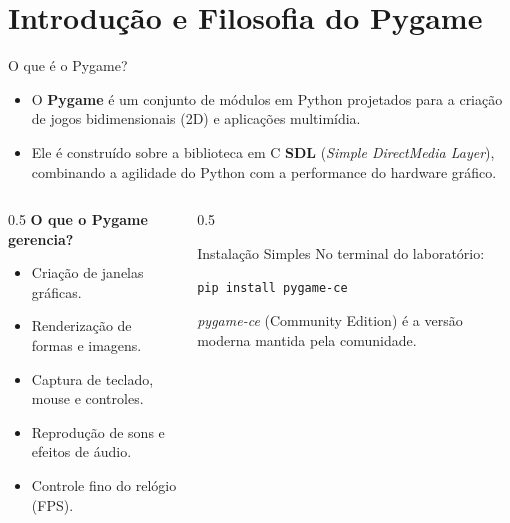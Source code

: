 \section{Introdução e Filosofia do Pygame}

\begin{frame}{O que é o Pygame?}
    \begin{itemize}
        \item O \textbf{Pygame} é um conjunto de módulos em Python projetados para a criação de jogos bidimensionais (2D) e aplicações multimídia.
        \item Ele é construído sobre a biblioteca em C \textbf{SDL} (\textit{Simple DirectMedia Layer}), combinando a agilidade do Python com a performance do hardware gráfico.
    \end{itemize}

    \vspace{0.3cm}
    \begin{columns}
        \begin{column}{0.5\textwidth}
            \textbf{O que o Pygame gerencia?}
            \begin{itemize}
                \item Criação de janelas gráficas.
                \item Renderização de formas e imagens.
                \item Captura de teclado, mouse e controles.
                \item Reprodução de sons e efeitos de áudio.
                \item Controle fino do relógio (FPS).
            \end{itemize}
        \end{column}
        \begin{column}{0.5\textwidth}
            \begin{block}{Instalação Simples}
                No terminal do laboratório:
                \begin{center}
                    \texttt{pip install pygame-ce}
                \end{center}
                \small{\textit{pygame-ce} (Community Edition) é a versão moderna mantida pela comunidade.}
            \end{block}
        \end{column}
    \end{columns}
\end{frame}

